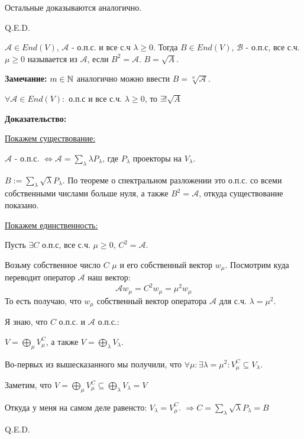 Остальные доказываются аналогично.

\hfill Q.E.D.

 $\mathcal{A} \in End(V)$, $\mathcal{A}$ - о.п.с. и все с.ч $\lambda \geq0$. Тогда $B \in End(V)$, $\mathcal{B}$ - о.п.с, все с.ч. $\mu \geq 0$ называется  из $\mathcal{A}$, если $B^2 = \mathcal{A}$. $B = \sqrt{A}$.

\textbf{Замечание:} $m \in \mathbb{N}$ аналогично можно ввести $B =\sqrt[n]{\mathcal{A}}$.


$\forall \mathcal{A}\in End(V):$ о.п.с и все с.ч. $\lambda\geq0$, то $\exists! \sqrt{A}$

\textbf{Доказательство:}

\uline{Покажем существование:}

$\mathcal{A}$ - о.п.с. $\Leftrightarrow \mathcal{A} = \sum\limits_{\lambda}\lambda P_\lambda$, где $P_\lambda $ проекторы на $V_\lambda$.

$B:= \sum\limits_{\lambda}\sqrt{\lambda} P_\lambda$. По теореме о спектральном разложении это о.п.с. со всеми собственными числами больше нуля, а также $B^2 = \mathcal{A}$, откуда существование показано.


\uline{Покажем единственность:}

Пусть $\exists C$ о.п.с, все с.ч. $\mu \geq 0$, $C^2 = \mathcal{A}$.

Возьму собственное число $C$ $\mu$  и его собственный вектор $w_\mu$. Посмотрим куда переводит оператор $\mathcal{A}$ наш вектор:
$$\mathcal{A} w_\mu = C^2 w_\mu = \mu^2 w_\mu$$
То есть получаю, что $w_\mu$ собственный вектор оператора $\mathcal{A}$ для с.ч. $\lambda = \mu^2$.

Я знаю, что $C$ о.п.с. и $\mathcal{A}$  о.п.с.:

$V = \bigoplus\limits_\mu V_\mu^C$, а также $V = \bigoplus\limits_\lambda V_\lambda$.

Во-первых из вышесказанного мы получили, что $\forall \mu: \exists \lambda = \mu^2: V_\mu^C \subseteq V_\lambda$.

Заметим, что $V = \bigoplus\limits_\mu V_\mu^C\subseteq
\bigoplus\limits_{\lambda}V_\lambda = V$

Откуда у меня на самом деле равенсто: $V_\lambda = V_\mu ^C$. $\Rightarrow C = \sum\limits_\lambda \sqrt{\lambda} P_\lambda = B$

\hfill Q.E.D.



